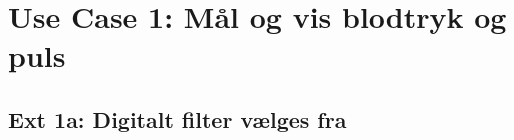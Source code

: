 \section{Use Case 1: Mål og vis blodtryk og puls}

\subsection{Ext 1a: Digitalt filter vælges fra}
\clearpage